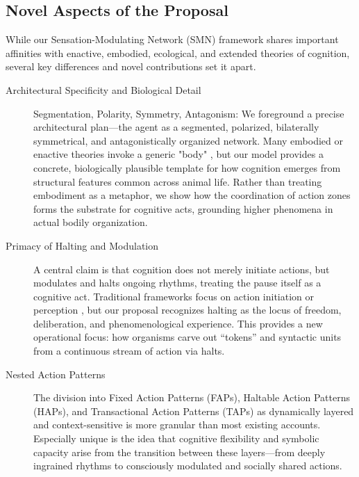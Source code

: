 \subsection{Novel Aspects of the Proposal}
While our Sensation-Modulating Network (SMN) framework shares important affinities with enactive, embodied, ecological, and extended theories of cognition, several key differences and novel contributions set it apart. 
\begin{description}
    \item[Architectural Specificity and Biological Detail] 
    Segmentation, Polarity, Symmetry, Antagonism: We foreground a precise architectural plan—the agent as a segmented, polarized, bilaterally symmetrical, and antagonistically organized network. Many embodied or enactive theories invoke a generic "body" \cite{clark1997being, gallagher2005how}, but our model provides a concrete, biologically plausible template for how cognition emerges from structural features common across animal life.      Rather than treating embodiment as a metaphor, we show how the coordination of action zones forms the substrate for cognitive acts, grounding higher phenomena in actual bodily organization.

    \item[Primacy of Halting and Modulation]
    A central claim is that cognition does not merely initiate actions, but modulates and halts ongoing rhythms, treating the pause itself as a cognitive act. Traditional frameworks focus on action initiation or perception \cite{fodor_modularity_1983, chomsky1965aspects}, but our proposal recognizes halting as the locus of freedom, deliberation, and phenomenological experience.  This provides a new operational focus: how organisms carve out “tokens” and syntactic units from a continuous stream of action via halts.

    \item[Nested Action Patterns] 
    The division into Fixed Action Patterns (FAPs), Haltable Action Patterns (HAPs), and Transactional Action Patterns (TAPs) as dynamically layered and context-sensitive is more granular than most existing accounts. Especially unique is the idea that cognitive flexibility and symbolic capacity arise from the transition between these layers—from deeply ingrained rhythms to consciously modulated and socially shared actions.


\end{description}
